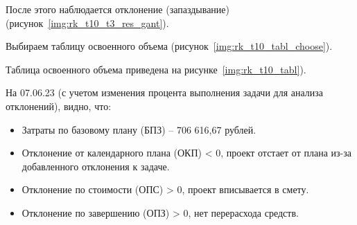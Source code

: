 После этого наблюдается отклонение (запаздывание)
(рисунок~\ref{img:rk_t10_t3_res_gant}). 

Выбираем таблицу освоенного объема (рисунок~\ref{img:rk_t10_tabl_choose}). 

Таблица освоенного объема приведена на рисунке~\ref{img:rk_t10_tabl}). 

На 07.06.23 (с учетом изменения процента выполнения задачи для анализа отклонений), видно, что:
\begin{itemize}[label = ---]
	\item Затраты по базовому плану (БПЗ) – 706 616,67 рублей.
	\item Отклонение от календарного плана (ОКП) < 0, проект отстает от 
	плана из-за добавленного отклонения к задаче.
	\item Отклонение по стоимости (ОПС) > 0, проект вписывается в
	смету.
	\item Отклонение по завершению (ОПЗ) > 0, нет перерасхода 
	средств.
\end{itemize}


